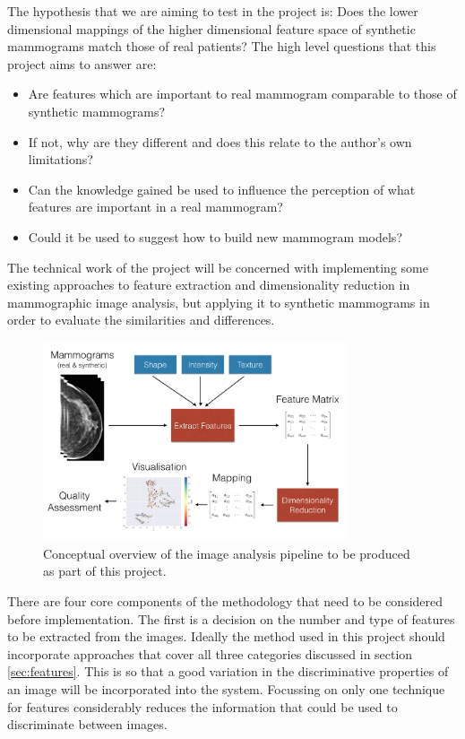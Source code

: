 The hypothesis that we are aiming to test in the project is: Does the lower dimensional mappings of the higher dimensional feature space of synthetic mammograms match those of real patients? The high level questions that this project aims to answer are:

\begin{itemize}
	\item Are features which are important to real mammogram comparable to those of synthetic mammograms?
	\item If not, why are they different and does this relate to the author's own limitations?
	\item Can the knowledge gained be used to influence the perception of what features are important in a real mammogram?
	\item Could it be used to suggest how to build new mammogram models?
\end{itemize}

The technical work of the project will be concerned with implementing some existing approaches to feature extraction and dimensionality reduction in mammographic image analysis, but applying it to synthetic mammograms in order to evaluate the similarities and differences.

\begin{figure}
	\label{fig:pipeline-diagram}
	\centering
	\includegraphics[width=0.8\textwidth]{Images/pipeline-diagram.png}	
	\caption{Conceptual overview of the image analysis pipeline to be produced as part of this project.}
\end{figure}

There are four core components of the methodology that need to be considered before implementation. The first is a decision on the number and type of features to be extracted from the images. Ideally the method used in this project should incorporate approaches that cover all three categories discussed in section \ref{sec:features}. This is so that a good variation in the discriminative properties of an image will be incorporated into the system. Focussing on only one technique for features considerably reduces the information that could be used to discriminate between images. 

